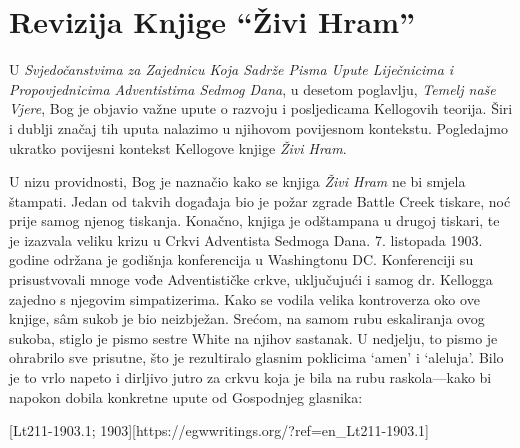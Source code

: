 \chapter{Revizija Knjige “Živi Hram”}

U \textit{Svjedočanstvima za Zajednicu Koja Sadrže Pisma Upute Liječnicima i Propovjednicima Adventistima Sedmog Dana}, u desetom poglavlju, \textit{Temelj naše Vjere}, Bog je objavio važne upute o razvoju i posljedicama Kellogovih teorija. Širi i dublji značaj tih uputa nalazimo u njihovom povijesnom kontekstu. Pogledajmo ukratko povijesni kontekst Kellogove knjige \textit{Živi Hram}.

U nizu providnosti, Bog je naznačio kako se knjiga \textit{Živi Hram} ne bi smjela štampati. Jedan od takvih događaja bio je požar zgrade Battle Creek tiskare, noć prije samog njenog tiskanja. Konačno, knjiga je odštampana u drugoj tiskari, te je izazvala veliku krizu u Crkvi Adventista Sedmoga Dana. 7. listopada 1903. godine održana je godišnja konferencija u Washingtonu DC. Konferenciji su prisustvovali mnoge vođe Adventističke crkve, uključujući i samog dr. Kellogga zajedno s njegovim simpatizerima. Kako se vodila velika kontroverza oko ove knjige, sâm sukob je bio neizbježan. Srećom, na samom rubu eskaliranja ovog sukoba, stiglo je pismo sestre White na njihov sastanak. U nedjelju, to pismo je ohrabrilo sve prisutne, što je rezultiralo glasnim poklicima ‘amen’ i ‘aleluja’. Bilo je to vrlo napeto i dirljivo jutro za crkvu koja je bila na rubu raskola—kako bi napokon dobila konkretne upute od Gospodnjeg glasnika:

[Lt211-1903.1; 1903][https://egwwritings.org/?ref=en\_Lt211-1903.1]

